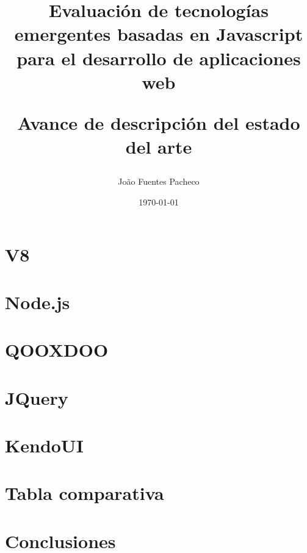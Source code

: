 \documentclass[letter, 10pt]{article}
\begin{document}
\title{Evaluación de tecnologías emergentes basadas en Javascript para el desarrollo de aplicaciones web \\ \begin{Large}Avance de descripción del estado del arte\end{Large}}
\author{Jo\~ao Fuentes Pacheco}
\date{\today}
\maketitle


\section{V8}
  
  \newpage
  
\section{Node.js}
  
  
\section{QOOXDOO}
  
  
\section{JQuery}
  
  
\section{KendoUI}
  
  
\section{Tabla comparativa}
  
  
  
\section{Conclusiones}
  
\end{document}
